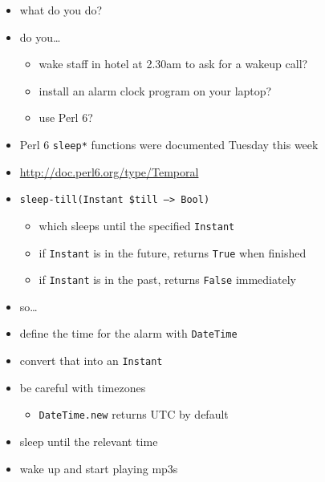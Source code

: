 \documentclass[c]{beamer}
\begin{document}
\begin{frame}[fragile]
    \begin{itemize}
        \item what do you do?
            \pause{}
        \item do you\ldots
            \begin{itemize}
                \item wake staff in hotel at 2.30am to ask for a wakeup call?
                    \pause{}
                \item install an alarm clock program on your laptop?
                    \pause{}
                \item use Perl 6?
            \end{itemize}
            \pause{}
        \item Perl 6 \texttt{sleep*} functions were documented Tuesday this week
        \item \url{http://doc.perl6.org/type/Temporal}
        \item \texttt{sleep-till(Instant \$till --> Bool)}
        \begin{itemize}
            \item which sleeps until the specified \texttt{Instant}
            \item if \texttt{Instant} is in the future, returns \texttt{True} when finished
            \item if \texttt{Instant} is in the past, returns \texttt{False} immediately
        \end{itemize}
    \end{itemize}
\end{frame}

\begin{frame}
    \begin{itemize}
        \item so\ldots
            \pause{}
        \item define the time for the alarm with \texttt{DateTime}
        \item convert that into an \texttt{Instant}
        \item be careful with timezones
            \begin{itemize}
                \item \texttt{DateTime.new} returns UTC by default
            \end{itemize}
        \item sleep until the relevant time
        \item wake up and start playing mp3s
    \end{itemize}
\end{frame}
\end{document}
